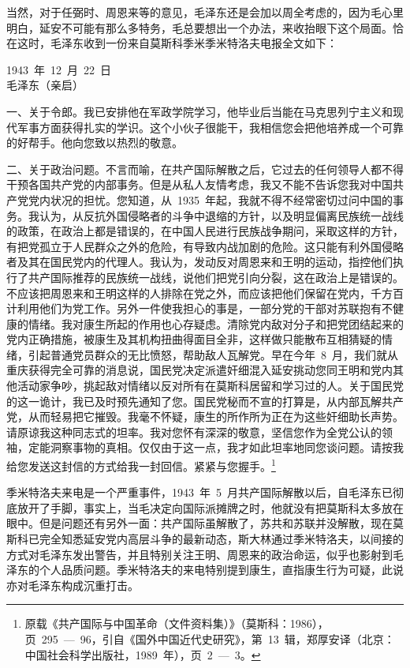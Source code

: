 当然，对于任弼时、周恩来等的意见，毛泽东还是会加以周全考虑的，因为毛心里明白，延安不可能有那么多特务，毛总要想出一个办法，来收抬眼下这个局面。恰在这时，毛泽东收到一份来自莫斯科季米季米特洛夫电报全文如下：
\begin{quoting}
1943~年~12~月~22~日\\毛泽东（亲启）

一、关于令郎。我已安排他在军政学院学习，他毕业后当能在马克思列宁主义和现代军事方面获得扎实的学识。这个小伙子很能干，我相信您会把他培养成一个可靠的好帮手。他向您致以热烈的敬意。

二、关于政治问题。不言而喻，在共产国际解散之后，它过去的任何领导人都不得干预各国共产党的内部事务。但是从私人友情考虑，我又不能不告诉您我对中国共产党党内状况的担忧。您知道，从~1935~年起，我就不得不经常密切过问中国的事务。我认为，从反抗外国侵略者的斗争中退缩的方针，以及明显偏离民族统一战线的政策，在政治上都是错误的，在中国人民进行民族战争期问，采取这样的方针，有把党孤立于人民群众之外的危险，有导致内战加剧的危险。这只能有利外国侵略者及其在国民党内的代理人。我认为，发动反对周恩来和王明的运动，指控他们执行了共产国际推荐的民族统一战线，说他们把党引向分裂，这在政治上是错误的。不应该把周恩来和王明这样的人排除在党之外，而应该把他们保留在党内，千方百计利用他们为党工作。另外一件使我担心的事是，一部分党的干部对苏联抱有不健康的情绪。我对康生所起的作用也心存疑虑。清除党内敌对分子和把党团结起来的党内正确措施，被康生及其机构扭曲得面目全非，这样做只能散布互相猜疑的情绪，引起普通党员群众的无比愤怒，帮助敌人瓦解党。早在今年~8~月，我们就从重庆获得完全可靠的消息说，国民党决定派遣奸细混入延安挑动您同王明和党内其他活动家争吵，挑起敌对情绪以反对所有在莫斯科居留和学习过的人。关于国民党的这一诡计，我已及时预先通知了您。国民党秘而不宣的打算是，从内部瓦解共产党，从而轻易把它摧毁。我毫不怀疑，康生的所作所为正在为这些奸细助长声势。请原谅我这种同志式的坦率。我对您怀有深深的敬意，坚信您作为全党公认的领袖，定能洞察事物的真相。仅仅由于这一点，我才如此坦率地同您谈问题。请按我给您发送这封信的方式给我一封回信。紧紧与您握手。\footnote{原载《共产国际与中国革命（文件资料集）》（莫斯科：1986），页~295~—~96，引自《国外中国近代史研究》，第~13~辑，郑厚安译（北京：中国社会科学出版社，1989~年），页~2~—~3。}
\end{quoting}

季米特洛夫来电是一个严重事件，1943~年~5~月共产国际解散以后，自毛泽东已彻底放开了手脚，事实上，当毛决定向国际派摊牌之时，他就没有把莫斯科太多放在眼中。但是问题还有另外一面：共产国际虽解散了，苏共和苏联并没解散，现在莫斯科已完全知悉延安党内高层斗争的最新动态，斯大林通过季米特洛夫，以间接的方式对毛泽东发出警告，并且特别关注王明、周恩来的政治命运，似乎也影射到毛泽东的个人品质问题。季米特洛夫的来电特别提到康生，直指康生行为可疑，此说亦对毛泽东构成沉重打击。

